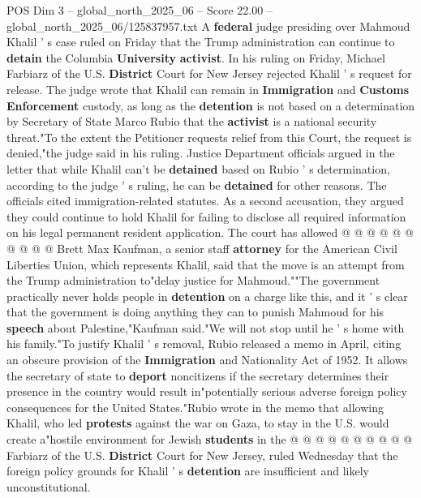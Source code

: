 \begin{textsample}{POS Dim 3 – global\_north\_2025\_06 – Score 22.00 – global\_north\_2025\_06/125837957.txt}  \label{ex:f3_pos_110}
A \textbf{federal} judge presiding over Mahmoud Khalil ' s case ruled on Friday that the Trump administration can continue to \textbf{detain} the Columbia \textbf{University} \textbf{activist}.
In his ruling on Friday, Michael Farbiarz of the U.S. \textbf{District} Court for New Jersey rejected Khalil ' s request for release.
The judge wrote that Khalil can remain in \textbf{Immigration} and \textbf{Customs} \textbf{Enforcement} custody, as long as the \textbf{detention} is not based on a determination by Secretary of State Marco Rubio that the \textbf{activist} is a national security threat."To the extent the Petitioner requests relief from this Court, the request is denied,"the judge said in his ruling.
Justice Department officials argued in the letter that while Khalil can't be \textbf{detained} based on Rubio ' s determination, according to the judge ' s ruling, he can be \textbf{detained} for other reasons.
The officials cited immigration-related statutes.
As a second accusation, they argued they could continue to hold Khalil for failing to disclose all required information on his legal permanent resident application.
The court has allowed @ @ @ @ @ @ @ @ @ @ Brett Max Kaufman, a senior staff \textbf{attorney} for the American Civil Liberties Union, which represents Khalil, said that the move is an attempt from the Trump administration to"delay justice for Mahmoud.""The government practically never holds people in \textbf{detention} on a charge like this, and it ' s clear that the government is doing anything they can to punish Mahmoud for his \textbf{speech} about Palestine,"Kaufman said."We will not stop until he ' s home with his family."To justify Khalil ' s removal, Rubio released a memo in April, citing an obscure provision of the \textbf{Immigration} and Nationality Act of 1952.
It allows the secretary of state to \textbf{deport} noncitizens if the secretary determines their presence in the country would result in"potentially serious adverse foreign policy consequences for the United States."Rubio wrote in the memo that allowing Khalil, who led \textbf{protests} against the war on Gaza, to stay in the U.S. would create a"hostile environment for Jewish \textbf{students} in the @ @ @ @ @ @ @ @ @ @ Farbiarz of the U.S. \textbf{District} Court for New Jersey, ruled Wednesday that the foreign policy grounds for Khalil ' s \textbf{detention} are insufficient and likely unconstitutional.

\end{textsample}
